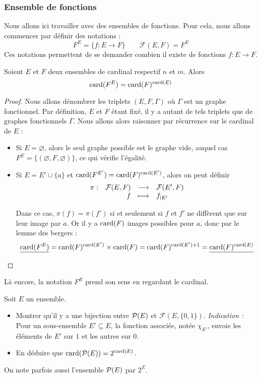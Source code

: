 \subsubsection{Ensemble de fonctions}

Nous allons ici travailler avec des ensembles de fonctions. Pour cela, nous allons commencer par définir des notations : $$F^E=\{f : E\to F\}\qquad \mathcal{F}(E,F)=F^E$$ Ces notations permettent de se demander combien il existe de fonctions $f : E \to F$.

\begin{prop}
    Soient $E$ et $F$ deux ensembles de cardinal respectif $n$ et $m$. Alors 
    $$ \mathrm{card}(F^E)=\mathrm{card}(F) ^{\mathrm{card}(E)}$$
\end{prop}

\begin{proof}
    Nous allons dénombrer les triplets $(E,F,\Gamma)$ où $\Gamma$ est un graphe fonctionnel. Par définition, $E$ et $F$ étant fixé, il y a autant de tels triplets que de graphes fonctionnels $\Gamma$. Nous allons alors raisonner par récurrence sur le cardinal de $E$ :
    \begin{itemize}[label=$\bullet$]
        \item Si $E=\varnothing$, alors le seul graphe possible est le graphe vide, auquel cas \underline{$F^E=\{(\varnothing,F,\varnothing)\}$}, ce qui vérifie l'égalité.
        \item Si $E=E'\cup \{a\}$ et $\mathrm{card}(F^{E'})=\mathrm{card}(F)^{\mathrm{card}(E')}$, alors on peut définir $$\begin{array}[t]{lrcl} \pi: & \mathcal F(E,F) & \longrightarrow & \mathcal F(E',F) \\ & f & \longmapsto & f_{|E'} \end{array}$$ 
        
        Dans ce cas, $\pi(f)=\pi(f')$ si et seulement si $f$ et $f'$ ne diffèrent que sur leur image par $a$. Or il y a $\mathrm{card}(F)$ images possibles pour $a$, donc par le lemme des bergers : $$\underline{\mathrm{card}(F^E)}=\mathrm{card}(F)^{\mathrm{card}(E')} \times \mathrm{card}(F) = \mathrm{card}(F)^{\mathrm{card}(E')+1}=\underline{\mathrm{card}(F) ^{\mathrm{card}(E)}}$$
    \end{itemize}
\end{proof}

\begin{rmk}
    Là encore, la notation $F^E$ prend son sens en regardant le cardinal.
\end{rmk}

\begin{exo}
    Soit $E$ un ensemble. 
    \begin{itemize}[label=$\bullet$]
        \item Montrer qu'il y a une bijection entre $\mathcal P (E)$ et $\mathcal F(E,\{0,1\})$. \textit{Indication :} Pour un sous-ensemble $E'\subseteq E$, la fonction associée, notée $\chi_{E'}$, envoie les éléments de $E'$ sur $1$ et les autres sur $0$.
        \item En déduire que $\mathrm{card}(\mathcal P (E))=2^{\mathrm{card}(E)}$.
    \end{itemize}
    \begin{rmk}
        On note parfois aussi l'ensemble $\mathcal P (E)$ par $2^E$.
    \end{rmk}
\end{exo}

